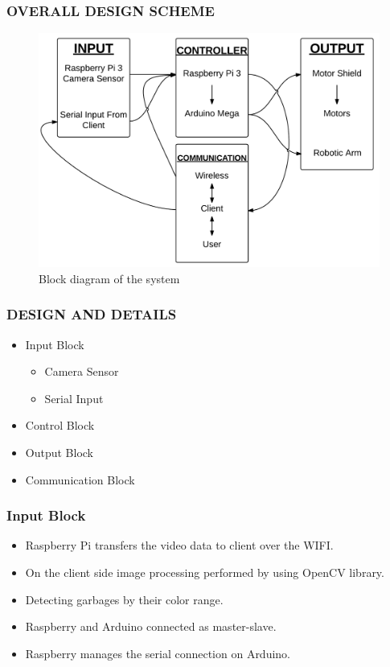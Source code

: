 \documentclass{beamer}
\begin{document}
 \begin{frame}
  \frametitle{OVERALL DESIGN SCHEME}
  \begin{figure}[h]
   \begin{center}
    \includegraphics[scale=0.6]{block_diagram}
    \caption{Block diagram of the system}
   \end{center}
  \end{figure}
 \end{frame}
 
 \begin{frame}
  \frametitle{DESIGN AND DETAILS}
  \begin{itemize}
   \item Input Block
   \begin{itemize}
    \item Camera Sensor
    \item Serial Input
   \end{itemize}
   \item Control Block
   \item Output Block
   \item Communication Block
  \end{itemize}
 \end{frame}

 \begin{frame}
  \frametitle{Input Block}
  \begin{itemize}
    \item Raspberry Pi transfers the video data to client over the WIFI.
    \item On the client side image processing performed by using OpenCV library.
    \item Detecting garbages by their color range.
    \item Raspberry and Arduino connected as master-slave.
    \item Raspberry manages the serial connection on Arduino.
  \end{itemize}
 \end{frame}
 
\end{document}
